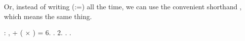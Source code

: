 \documentclass[12pt]{report}
\begin{document}
\subsubsection{ }

 Or, instead of writing    (:=) all the
    time, we can use the convenient shorthand \coqdoctac{\ensuremath{\exists}} , which means
    the same thing. \begin{coqdoccode}
\coqdocemptyline
\coqdocnoindent
{}  : \coqdoctac{\ensuremath{\exists}} ,  + ( \ensuremath{\times} ) = 6.\coqdoceol
\coqdocnoindent
{}.\coqdoceol
\coqdocindent{1.00em}
\coqdoctac{\ensuremath{\exists}} 2.\coqdoceol
\coqdocindent{1.00em}
. .\coqdoceol
\coqdocemptyline
\end{coqdoccode}
\subsubsection{ }
\end{document}
